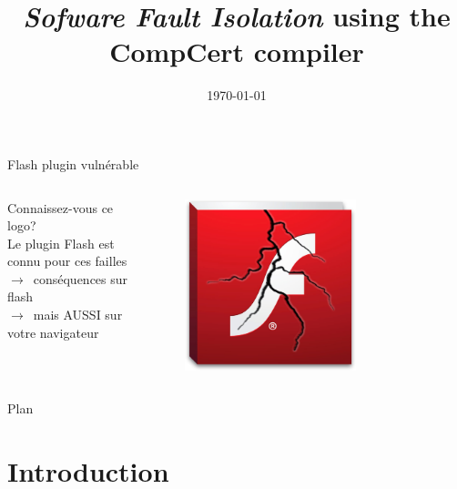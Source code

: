 \documentclass[10pt,usenames,dvipsnames]{beamer}
\title{\textit{Sofware Fault Isolation} using the CompCert compiler}
\date{\today}
\author[\textit{Auteur}: Alexandre Dang \and \textit{Superviseur}: Frédéric Besson \and \textit{\'Equipe}: Celtique]
{%
	\texorpdfstring{
		\begin{columns}[t]
			\column{.45\linewidth}
				\textit{Auteur}: Alexandre Dang
			\column{.45\linewidth}
				\textit{Superviseur}: Frédéric Besson\\
				\textit{\'Equipe}: Celtique
		\end{columns}
	}
	{\textit{Auteur}: Alexandre Dang, \textit{Superviseur}: Frédéric Besson, \textit{\'Equipe}: Celtique}
}
\institute{CentraleSupélec \and %
           Université de Rennes 1
}
\begin{document}
\begin{frame}
	\maketitle
\end{frame}


\begin{frame}{Flash plugin vulnérable}
	\begin{columns}[onlytextwidth]
		\begin{column}{0.5\textwidth}
			Connaissez-vous ce logo?\\
			\vspace{5mm}
			Le plugin Flash est connu pour ces failles
			$\rightarrow$~conséquences sur flash\\
			$\rightarrow$~mais AUSSI sur votre navigateur
		\end{column}
		\begin{column}{0.5\textwidth}
			\begin{figure}
				\centering
				\includegraphics[width=0.7\textwidth]{flash.jpg}
			\end{figure}
		\end{column}
	\end{columns}
\end{frame}

\begin{frame} 
	\begin{center}{\Large Plan}\end{center}
	\tableofcontents[hideallsubsections]
\end{frame}
\section{Introduction}
\end{document}

